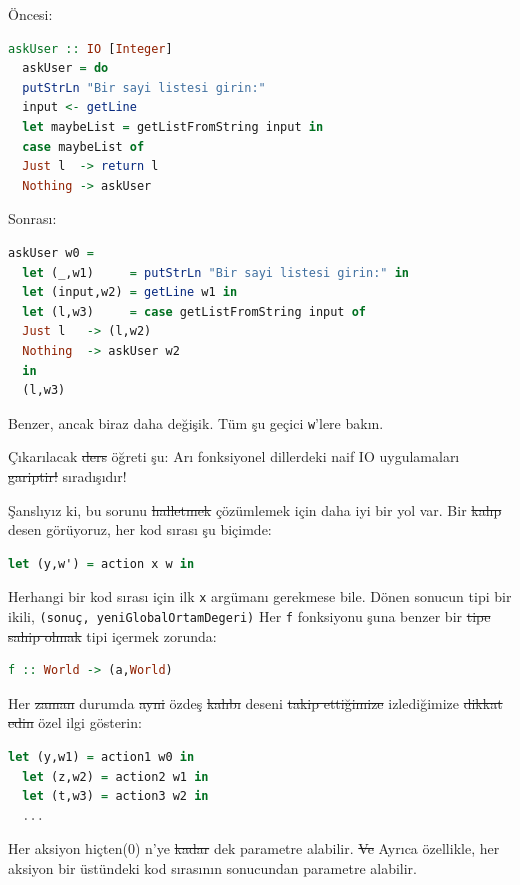 \documentclass[a4paper,14pt,openany]{extbook} %
\begin{document}
Öncesi:

\begin{lstlisting}[language=Haskell]
  askUser :: IO [Integer]
  askUser = do
  putStrLn "Bir sayi listesi girin:"
  input <- getLine
  let maybeList = getListFromString input in
  case maybeList of
  Just l  -> return l
  Nothing -> askUser
\end{lstlisting}

Sonrası:

\begin{lstlisting}[language=Haskell]
  askUser w0 =
  let (_,w1)     = putStrLn "Bir sayi listesi girin:" in
  let (input,w2) = getLine w1 in
  let (l,w3)     = case getListFromString input of
  Just l   -> (l,w2)
  Nothing  -> askUser w2
  in
  (l,w3)
\end{lstlisting}

Benzer, ancak biraz daha değişik. Tüm şu geçici \lstinline!w!'lere bakın.

Çıkarılacak \st{ders} öğreti şu: Arı fonksiyonel dillerdeki naif IO uygulamaları
\st{gariptir!} sıradışıdır!

Şanslıyız ki, bu sorunu \st{halletmek} çözümlemek için daha iyi bir yol var. Bir \st{kalıp} desen
görüyoruz, her kod sırası şu biçimde:

\begin{lstlisting}[language=Haskell]
  let (y,w') = action x w in
\end{lstlisting}

Herhangi bir kod sırası için ilk \lstinline!x! argümanı gerekmese bile. Dönen
sonucun tipi bir ikili, \mbox{\lstinline!(sonuç, yeniGlobalOrtamDegeri)!} Her
\lstinline!f! fonksiyonu şuna benzer bir \st{tipe sahip olmak} tipi içermek zorunda:

\begin{lstlisting}[language=Haskell]
  f :: World -> (a,World)
\end{lstlisting}

Her \st{zaman} durumda \st{ayni} özdeş \st{kalıbı} deseni \st{takip ettiğimize} izlediğimize
\st{dikkat edin} özel ilgi gösterin:

\begin{lstlisting}[language=Haskell]
  let (y,w1) = action1 w0 in
  let (z,w2) = action2 w1 in
  let (t,w3) = action3 w2 in
  ...
\end{lstlisting}

Her aksiyon hiçten(0) n'ye \st{kadar} dek parametre alabilir. \st{Ve} Ayrıca özellikle, her
aksiyon bir üstündeki kod sırasının sonucundan parametre alabilir.
\end{document}
